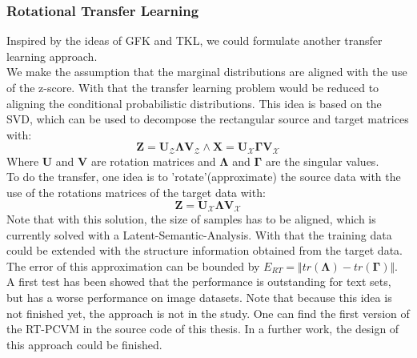 \subsubsection{Rotational Transfer Learning}
Inspired by the ideas of \acs{GFK} and \acs{TKL}, we could formulate another transfer learning approach.\\
We make the assumption that the marginal distributions are aligned with the use of the z-score.
With that the transfer learning problem would be reduced to aligning the conditional probabilistic distributions.
This idea is based on the \acl{SVD}, which can be used to decompose the rectangular source and target matrices with:\cite{Golub.1965} 
\begin{equation}
\mathbf{Z}= \mathbf{U}_\mathcal{Z}\boldsymbol{\Lambda}\mathbf{V}_\mathcal{Z} \land \mathbf{X} = \mathbf{U}_\mathcal{X}\boldsymbol{\Gamma}\mathbf{V}_\mathcal{X}
\end{equation}
Where $\mathbf{U}$ and $\mathbf{V}$ are rotation matrices and $\boldsymbol{\Lambda}$ and $\boldsymbol{\Gamma}$ are the singular values.\\
To do the transfer, one idea is to 'rotate'(approximate) the source data with the use of the rotations matrices of the target data with:
\begin{equation}
\mathbf{Z}= \mathbf{U}_\mathcal{X}\boldsymbol{\Lambda}\mathbf{V}_\mathcal{X}
\end{equation}   
Note that with this solution, the size of samples has to be aligned, which is currently solved with a Latent-Semantic-Analysis.
With that the training data could be extended with the structure information obtained from the target data.
The error of this approximation can be bounded by $E_{RT} =\Vert tr(\boldsymbol{\Lambda}) - tr(\boldsymbol{\Gamma})\Vert$.
A first test has been showed that the performance is outstanding for text sets, but has a worse performance on image datasets.
Note that because this idea is not finished yet, the approach is not in the study. 
One can find the first version of the \ac{RT-PCVM} in the source code of this thesis.
In a further work, the design of this approach could be finished.
